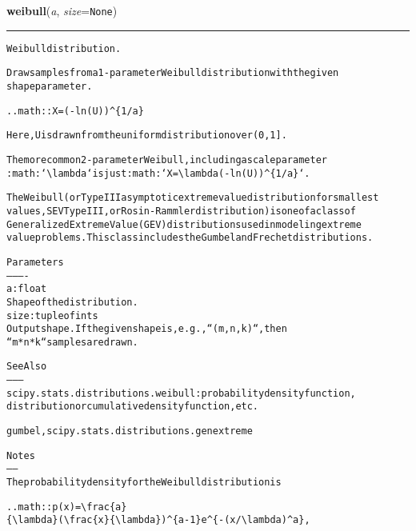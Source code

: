     \label{trunk:qstkutil:bollinger:weibull}

    \vspace{0.5ex}

\hspace{.8\funcindent}\begin{boxedminipage}{\funcwidth}

    \raggedright \textbf{weibull}(\textit{a}, \textit{size}={\tt None})

    \vspace{-1.5ex}

    \rule{\textwidth}{0.5\fboxrule}
\setlength{\parskip}{2ex}
\begin{alltt}
Weibull distribution.

Draw samples from a 1-parameter Weibull distribution with the given
shape parameter.

.. math:: X = (-ln(U)){\textasciicircum}\{1/a\}

Here, U is drawn from the uniform distribution over (0,1].

The more common 2-parameter Weibull, including a scale parameter
:math:`{\textbackslash}lambda` is just :math:`X = {\textbackslash}lambda(-ln(U)){\textasciicircum}\{1/a\}`.

The Weibull (or Type III asymptotic extreme value distribution for smallest
values, SEV Type III, or Rosin-Rammler distribution) is one of a class of
Generalized Extreme Value (GEV) distributions used in modeling extreme
value problems.  This class includes the Gumbel and Frechet distributions.

Parameters
----------
a : float
    Shape of the distribution.
size : tuple of ints
    Output shape.  If the given shape is, e.g., ``(m, n, k)``, then
    ``m * n * k`` samples are drawn.

See Also
--------
scipy.stats.distributions.weibull : probability density function,
    distribution or cumulative density function, etc.

gumbel, scipy.stats.distributions.genextreme

Notes
-----
The probability density for the Weibull distribution is

.. math:: p(x) = {\textbackslash}frac\{a\}
                 \{{\textbackslash}lambda\}({\textbackslash}frac\{x\}\{{\textbackslash}lambda\}){\textasciicircum}\{a-1\}e{\textasciicircum}\{-(x/{\textbackslash}lambda){\textasciicircum}a\},


\end{alltt}
\end{boxedminipage}
